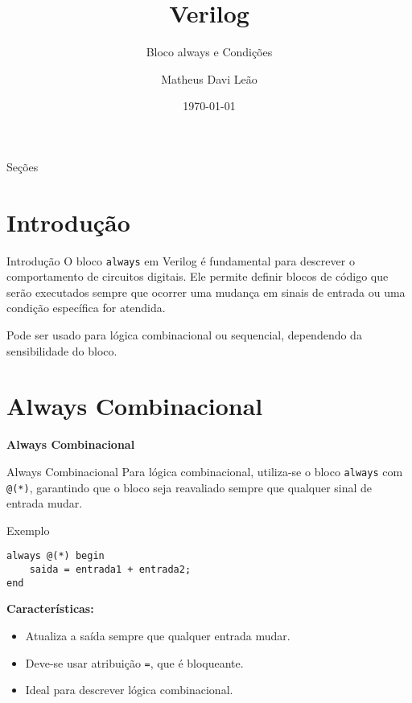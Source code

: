 \documentclass[aspectratio=169,xcolor=dvipsnames]{beamer}
\title{Verilog}
\subtitle{Bloco always e Condições}
\author{Matheus Davi Leão}
\institute
{
    Poliware \\
    Escola Politécnica da Universidade de São Paulo
}
\date{\today}
\begin{document}
\begin{frame}
    \titlepage
\end{frame}

\begin{frame}{Seções}
    \tableofcontents
\end{frame}

\section{Introdução}

\begin{frame}{Introdução}
    O bloco \texttt{always} em Verilog é fundamental para descrever o comportamento de circuitos digitais. Ele permite definir blocos de código que serão executados sempre que ocorrer uma mudança em sinais de entrada ou uma condição específica for atendida.

    Pode ser usado para lógica combinacional ou sequencial, dependendo da sensibilidade do bloco.
\end{frame}

\section{Always Combinacional}

\begin{frame}
    \Huge{\centerline{\textbf{Always Combinacional}}}
\end{frame}

\begin{frame}[fragile]{Always Combinacional}
Para lógica combinacional, utiliza-se o bloco \texttt{always} com \texttt{@(*)}, garantindo que o bloco seja reavaliado sempre que qualquer sinal de entrada mudar.

\begin{block}{Exemplo}
\begin{verbatim}
always @(*) begin
    saida = entrada1 + entrada2;
end
\end{verbatim}
\end{block}

\textbf{Características:}
\begin{itemize}
    \item Atualiza a saída sempre que qualquer entrada mudar.
    \item Deve-se usar atribuição \texttt{=}, que é bloqueante.
    \item Ideal para descrever lógica combinacional.
\end{itemize}
\end{frame}
\end{document}
